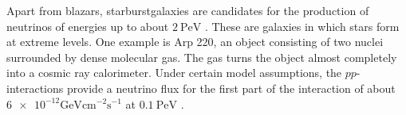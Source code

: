 Apart from blazars, starburstgalaxies are candidates for the production of neutrinos of energies up to about $\SI{2}{\peta\electronvolt}$ \cite{starburst2}.
These are galaxies in which stars form at extreme levels.
One example is Arp 220, an object consisting of two nuclei surrounded by dense molecular gas.
The gas turns the object almost completely into a cosmic ray calorimeter.
Under certain model assumptions, the $pp$-interactions provide a neutrino flux for the first part of the interaction of about $\num{6e-12}\si{\giga\electronvolt\centi\meter\tothe{-2}\second\tothe{-1}}$ at $\SI{0.1}{\peta\electronvolt}$ \cite{starburst}.
